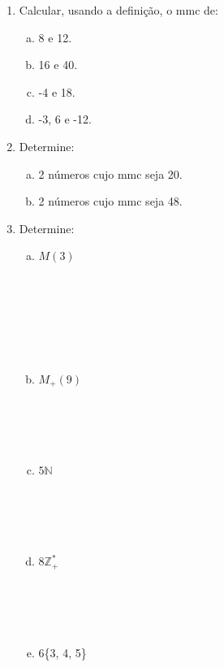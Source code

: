 \documentclass[a4paper,14pt]{article}
\begin{document}
\begin{multicols}{2}
\begin{enumerate}
			\begin{enumerate}[a)]
				\item 1
				\item 2
				\item 4
				\item 6
				\item 8
			\end{enumerate}
			\item Calcular, usando a definição, o mmc de:
			\begin{enumerate}[a)]
				\item 8 e 12.
				\item 16 e 40.
				\item -4 e 18.
				\item -3, 6 e -12.
			\end{enumerate}
			\item Determine:
			\begin{enumerate}[a)]
				\item 2 números cujo mmc seja 20.
				\item 2 números cujo mmc seja 48.
			\end{enumerate}
			\item Determine:
			\begin{enumerate}[a)]
				\item $M(3)$ \\\\\\\\\\\\\\
				\item $M_+(9)$ \\\\\\\\\\ 
				\item $5\mathbb{N}$ \\\\\\\\\\
				\item $8\mathbb{Z}_+^*$ \\\\\\\\\\
				\item 6\{3, 4, 5\} \\\\\\\\\\

\end{enumerate}
\end{enumerate}
\end{multicols}
\end{document}

